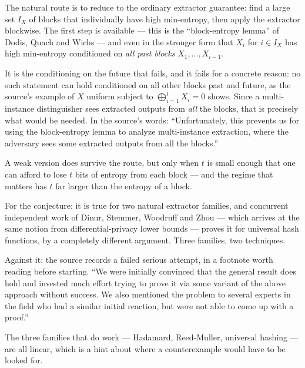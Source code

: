 \documentclass{aicr-conjecture}
\begin{document}
\begin{remark}\label{rem:obstruction}
The natural route is to reduce to the ordinary extractor guarantee: find a
large set $I_X$ of blocks that individually have high min-entropy, then
apply the extractor blockwise. The first step is available --- this is the
``block-entropy lemma'' of Dodis, Quach and Wichs --- and even in the
stronger form that $X_i$ for $i \in I_X$ has high min-entropy conditioned
on \emph{all past blocks} $X_1, \dots, X_{i-1}$.

It is the conditioning on the future that fails, and it fails for a
concrete reason: no such statement can hold conditioned on all other
blocks past and future, as the source's example of $X$ uniform subject to
$\bigoplus_{i=1}^{t} X_i = 0$ shows. Since a multi-instance distinguisher
sees extracted outputs from \emph{all} the blocks, that is precisely what
would be needed. In the source's words: ``Unfortunately, this prevents us
for using the block-entropy lemma to analyze multi-instance extraction,
where the adversary sees some extracted outputs from all the blocks.''

A weak version does survive the route, but only when $t$ is small enough
that one can afford to lose $t$ bits of entropy from each block --- and
the regime that matters has $t$ far larger than the entropy of a block.
\end{remark}

\begin{remark}\label{rem:evidence}
For the conjecture: it is true for two natural extractor families, and
concurrent independent work of Dinur, Stemmer, Woodruff and Zhou --- which
arrives at the same notion from differential-privacy lower bounds ---
proves it for universal hash functions, by a completely different
argument. Three families, two techniques.

Against it: the source records a failed serious attempt, in a footnote
worth reading before starting. ``We were initially convinced that the
general result does hold and invested much effort trying to prove it via
some variant of the above approach without success. We also mentioned the
problem to several experts in the field who had a similar initial
reaction, but were not able to come up with a proof.''

The three families that do work --- Hadamard, Reed-Muller, universal
hashing --- are all linear, which is a hint about where a counterexample
would have to be looked for.
\end{remark}
\end{document}
